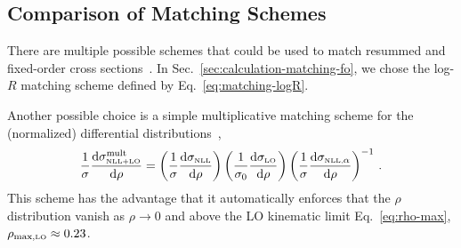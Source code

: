 \documentclass[letterpaper,11pt]{article}
\newcommand{\Sec}[1]{Sec.~\ref{#1}}
\newcommand{\Eq}[1]{Eq.~\eqref{#1}}
\begin{document}

\subsection{Comparison of Matching Schemes}
\label{app:details-matching-comp}

There are multiple possible schemes that could be used to match resummed and fixed-order cross sections~\cite{Catani:1992ua,Catani:1998sf,Jones:2003yv,Gehrmann:2008kh}. 
%
In \Sec{sec:calculation-matching-fo}, we chose the log-$R$ matching scheme defined by \Eq{eq:matching-logR}. 

Another possible choice is a simple multiplicative matching scheme for the (normalized) differential distributions~\cite{Marzani:2017mva,Marzani:2017kqd},
\begin{equation}
\label{eq:matching-mult}
\frac{1}{\sigma}\frac{\text{d}\sigma^{\rm mult}_{\mbox{\tiny NLL+LO}}}{\text{d}\rho} = \left(\frac{1}{\sigma}\frac{\text{d}\sigma_{\mbox{\tiny NLL}}}{\text{d}\rho}\right)  \left(\frac{1}{\sigma_0}\frac{\text{d}\sigma_{\mbox{\tiny LO}}}{\text{d}\rho}\right) \left(\frac{1}{\sigma} \frac{\text{d}\sigma_{\mbox{\tiny NLL,}\alpha}}{\text{d}\rho}\right)^{-1}  \,.
\end{equation}
This scheme has the advantage that it automatically enforces that the $\rho$ distribution vanish as $\rho\rightarrow 0$ and above the LO kinematic limit \Eq{eq:rho-max}, $\rho_{\mbox{\scriptsize max,\tiny LO}} \approx 0.23$. 
\end{document}
